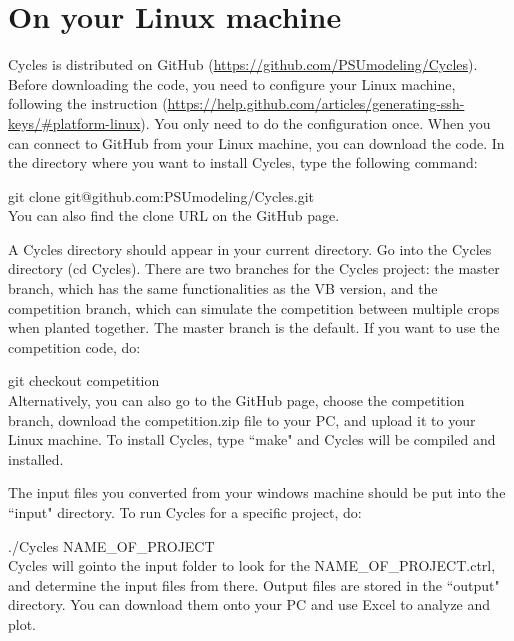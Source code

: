 \documentclass[11pt]{article}
\begin{document}
\section{On your Linux machine}
Cycles is distributed on GitHub (\url{https://github.com/PSUmodeling/Cycles}).
Before downloading the code, you need to configure your Linux machine, following the instruction (\url{https://help.github.com/articles/generating-ssh-keys/#platform-linux}).
You only need to do the configuration once.
When you can connect to GitHub from your Linux machine, you can download the code.
In the directory where you want to install Cycles, type the following command:

git clone git@github.com:PSUmodeling/Cycles.git\\
You can also find the clone URL on the GitHub page.

A Cycles directory should appear in your current directory.
Go into the Cycles directory (cd Cycles).
There are two branches for the Cycles project:
the master branch, which has the same functionalities as the VB version, and the competition branch, which can simulate the competition between multiple crops when planted together.
The master branch is the default.
If you want to use the competition code, do:

git checkout competition\\

Alternatively, you can also go to the GitHub page, choose the competition branch, download the competition.zip file to your PC, and upload it to your Linux machine.
To install Cycles, type ``make" and Cycles will be compiled and installed.

The input files you converted from your windows machine should be put into the ``input" directory.
To run Cycles for a specific project, do:

./Cycles NAME\_OF\_PROJECT\\
Cycles will gointo the input folder to look for the NAME\_OF\_PROJECT.ctrl, and determine the input files from there.
Output files are stored in the ``output" directory.
You can download them onto your PC and use Excel to analyze and plot.
\end{document}
